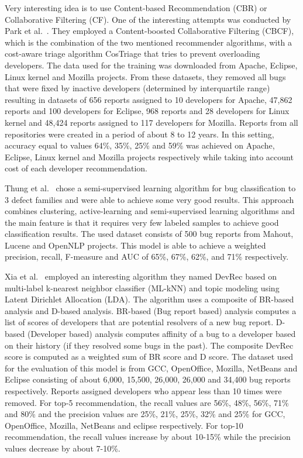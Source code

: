 Very interesting idea is to use Content-based Recommendation (CBR) or Collaborative Filtering (CF). One of the interesting attempts was conducted by Park et al.~\cite{Park2011}. They employed a Content-boosted Collaborative Filtering (CBCF), which is the combination of the two mentioned recommender algorithms, with a cost-aware triage algorithm CosTriage that tries to prevent overloading developers. The data used for the training was downloaded from Apache, Eclipse, Linux kernel and Mozilla projects. From these datasets, they removed all bugs that were fixed by inactive developers (determined by interquartile range) resulting in datasets of 656 reports assigned to 10 developers for Apache, 47,862 reports and 100 developers for Eclipse, 968 reports and 28 developers for Linux kernel and 48,424 reports assigned to 117 developers for Mozilla. Reports from all repositories were created in a period of about 8 to 12 years. In this setting, accuracy equal to values 64\%, 35\%, 25\% and 59\% was achieved on Apache, Eclipse, Linux kernel and Mozilla projects respectively while taking into account cost of each developer recommendation.

Thung et al.~\cite{Thung2015} chose a semi-supervised learning algorithm for bug classification to 3 defect families and were able to achieve some very good results. This approach combines clustering, active-learning and semi-supervised learning algorithms and the main feature is that it requires very few labeled samples to achieve good classification results. The used dataset consists of 500 bug reports from Mahout, Lucene and OpenNLP projects. This model is able to achieve a weighted precision, recall, F-measure and AUC of 65\%, 67\%, 62\%, and 71\%
 respectively.

Xia et al.~\cite{Xia2015} employed an interesting algorithm they named DevRec based on multi-label k-nearest neighbor classifier (ML-kNN) and topic modeling using Latent Dirichlet Allocation (LDA). The algorithm uses a composite of BR-based analysis and D-based analysis. BR-based (Bug report based) analysis computes a list of scores of developers that are potential resolvers of a new bug report. D-based (Developer based) analysis computes affinity of a bug to a developer based on their history (if they resolved some bugs in the past). The composite DevRec score is computed as a weighted sum of BR score and D score. The dataset used for the evaluation of this model is from GCC, OpenOffice, Mozilla, NetBeans and Eclipse consisting of about 6,000, 15,500, 26,000, 26,000 and 34,400 bug reports respectively. Reports assigned developers who appear less than 10 times were removed. For top-5 recommendation, the recall values are 56\%, 48\%, 56\%, 71\% and 80\% and the precision values are 25\%, 21\%, 25\%, 32\% and 25\% for GCC, OpenOffice, Mozilla, NetBeans and eclipse respectively. For top-10 recommendation, the recall values increase by about 10-15\% while the precision values decrease by about 7-10\%.
